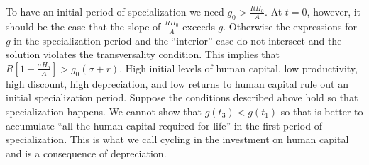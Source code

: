 \indent To have an initial period of specialization we need $g_{0} > \frac{R H_{0}}{A}$. At $t=0$, however, it should be the case that the slope of $\frac{R H_{0}}{A}$ exceeds $\dot{g}$. Otherwise the expressions for $g$ in the specialization period and the ``interior'' case do not intersect and the solution violates the transversality condition. This implies that $R \left[ 1 - \frac{\sigma H_{0}}{A} \right] > g_{0}(\sigma + r)$. High initial levels of human capital, low productivity, high discount, high depreciation, and low returns to human capital rule out an initial specialization period. Suppose the conditions described above hold so that specialization happens. We cannot show that $g(t_{3}) < g(t_{1})$ so that is better to accumulate ``all the human capital required for life'' in the first period of specialization. This is what we call cycling in the investment on human capital and is a consequence of depreciation.










